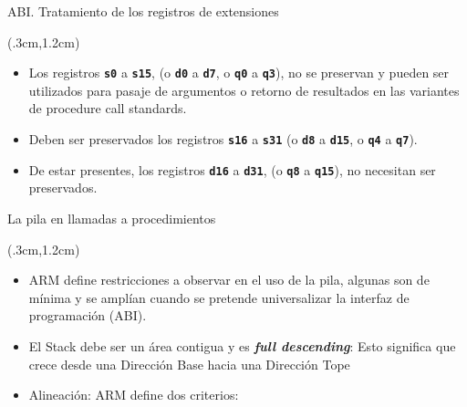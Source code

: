\documentclass[usenames,table,dvipsnames,aspectratio=169]{beamer}
\begin{document}
\begin{frame}{ABI. Tratamiento de los registros de extensiones}
 \begin{textblock*}{\textwidth}(.3cm,1.2cm)
  \begin{itemize}[<+(1)->] \justifying \parskip 0.5cm
   \item Los registros \texttt{\textbf{s0}} a \texttt{\textbf{s15}}, (o \textbf{\texttt{d0}} a \texttt{\textbf{d7}}, o \textbf{\texttt{q0}} a \textbf{\texttt{q3}}), no se preservan y pueden ser utilizados para pasaje de argumentos o retorno de resultados en las variantes de procedure call standards.
   \item Deben ser preservados los registros \texttt{\textbf{s16}} a \texttt{\textbf{s31}} (o \textbf{\texttt{d8}} a \texttt{\textbf{d15}}, o \textbf{\texttt{q4}} a \textbf{\texttt{q7}}).
   \item De estar presentes, los registros \textbf{\texttt{d16}} a \texttt{\textbf{d31}}, (o \textbf{\texttt{q8}} a \textbf{\texttt{q15}}), no necesitan ser preservados.
  \end{itemize}
 \end{textblock*}
\end{frame}

\begin{frame}{La pila en llamadas a procedimientos}
 \begin{textblock*}{\textwidth}(.3cm,1.2cm)
  \begin{itemize}[<+(1)->] \justifying  \parskip 0.5cm
   \item ARM define restricciones a observar en el uso de la pila, algunas son de mínima y se amplían cuando se pretende universalizar la interfaz de programación (ABI).
   \item El Stack debe ser un área contigua y es \textbf{\textit{full descending}}: Esto significa que crece desde una Dirección Base hacia una Dirección Tope
   \item Alineación: ARM define dos criterios:
  \end{itemize}
 \end{textblock*}
\end{frame}
\end{document}
